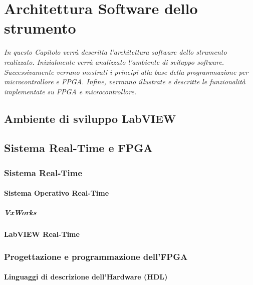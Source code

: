 \chapter{Architettura Software dello strumento}
\label{capitolo4}
\thispagestyle{empty}

\textit{In questo Capitolo verrà descritta l’architettura software dello strumento realizzato. Inizialmente verrà analizzato l’ambiente di sviluppo software. Successivamente verrano mostrati i principi alla base della programmazione per microcontrollore e FPGA. Infine, verranno illustrate e descritte le funzionalità implementate su FPGA e microcontrollore.}

\section{Ambiente di sviluppo LabVIEW}
\section{Sistema Real-Time e FPGA}

	\subsection{Sistema Real-Time}

		\subsubsection{Sistema Operativo Real-Time}

			\paragraph{VxWorks}

		\subsubsection{LabVIEW Real-Time}

	\subsection{Progettazione e programmazione dell'FPGA}
		
		\subsubsection{Linguaggi di descrizione dell'Hardware (HDL)}
		
